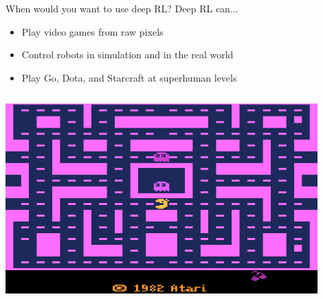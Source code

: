 \documentclass[9pt]{beamer}
\begin{document}
\begin{frame}{When would you want to use deep RL?}
Deep RL can...
\begin{itemize}
\item Play video games from raw pixels
\item Control robots in simulation and in the real world
\item Play Go, Dota, and Starcraft at superhuman levels
\end{itemize}

\begin{columns}
\begin{column}{0.33\textwidth}
    \begin{center}
     \includegraphics[width=0.9\textwidth]{ms_pacman}


\end{center}
\end{column}
\end{columns}
\end{frame}
\end{document}
